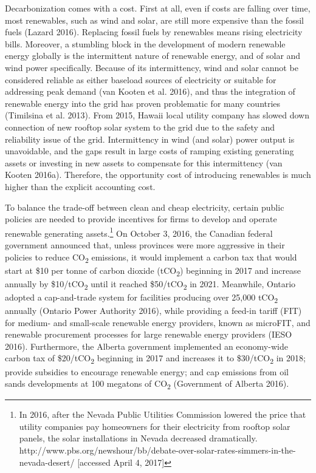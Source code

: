 \documentclass[10pt,letter]{article}
\begin{document}
Decarbonization comes with a cost. First at all, even if costs are
falling over time, most renewables, such as wind and solar, are still
more expensive than the fossil fuels (Lazard 2016). Replacing fossil
fuels by renewables means rising electricity bills. Moreover, a
stumbling block in the development of modern renewable energy globally
is the intermittent nature of renewable energy, and of solar and wind
power specifically. Because of its intermittency, wind and solar cannot
be considered reliable as either baseload sources of electricity or
suitable for addressing peak demand (van Kooten et al. 2016), and thus
the integration of renewable energy into the grid has proven problematic
for many countries (Timilsina et al. 2013). From 2015, Hawaii local
utility company has slowed down connection of new rooftop solar system
to the grid due to the safety and reliability issue of the grid.
Intermittency in wind (and solar) power output is unavoidable, and the
gaps result in large costs of ramping existing generating assets or
investing in new assets to compensate for this intermittency (van Kooten
2016a). Therefore, the opportunity cost of introducing renewables is
much higher than the explicit accounting cost.

To balance the trade-off between clean and cheap electricity, certain
public policies are needed to provide incentives for firms to develop
and operate renewable generating assets.\footnote{In 2016, after the
  Nevada Public Utilities Commission lowered the price that utility
  companies pay homeowners for their electricity from rooftop solar
  panels, the solar installations in Nevada decreased dramatically.
  http://www.pbs.org/newshour/bb/debate-over-solar-rates-simmers-in-the-nevada-desert/
  {[}accessed April 4, 2017{]}} On October 3, 2016, the Canadian federal
government announced that, unless provinces were more aggressive in
their policies to reduce CO\textsubscript{2} emissions, it would
implement a carbon tax that would start at \$10 per tonne of carbon
dioxide (tCO\textsubscript{2}) beginning in 2017 and increase annually
by \$10/tCO\textsubscript{2} until it reached \$50/tCO\textsubscript{2}
in 2021. Meanwhile, Ontario adopted a cap-and-trade system for
facilities producing over 25,000 tCO\textsubscript{2} annually (Ontario
Power Authority 2016), while providing a feed-in tariff (FIT) for
medium- and small-scale renewable energy providers, known as microFIT,
and renewable procurement processes for large renewable energy providers
(IESO 2016). Furthermore, the Alberta government implemented an
economy-wide carbon tax of \$20/tCO\textsubscript{2} beginning in 2017
and increases it to \$30/tCO\textsubscript{2} in 2018; provide subsidies
to encourage renewable energy; and cap emissions from oil sands
developments at 100 megatons of CO\textsubscript{2} (Government of
Alberta 2016).
\end{document}
